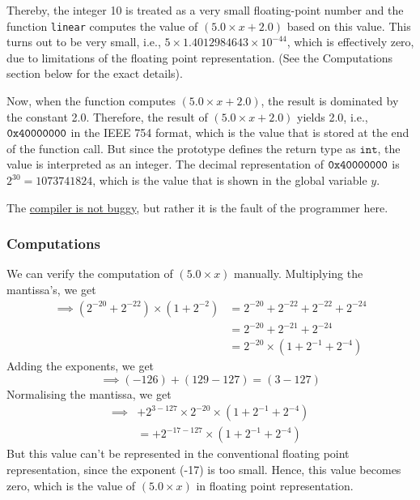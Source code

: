 Thereby, the integer 10 is treated as a very small floating-point number and the function \texttt{linear} computes the value of \( (5.0 \times x + 2.0) \) based on this value.
This turns out to be very small, i.e., \( 5 \times 1.4012984643 \times 10^{-44} \), which is effectively zero, due to limitations of the floating point representation.
(See the Computations section below for the exact details).

Now, when the function computes \( (5.0 \times x + 2.0) \), the result is dominated by the constant 2.0.
Therefore, the result of \( (5.0 \times x + 2.0) \) yields 2.0, i.e., \( \texttt{0x40000000} \) in the IEEE 754 format, which is the value that is stored at the end of the function call.
But since the prototype defines the return type as \( \texttt{int} \), the value is interpreted as an integer.
The decimal representation of \( \texttt{0x40000000} \) is \( 2^{30} = \boxed{1073741824} \), which is the value that is shown in the global variable \( y \).

The \underline{compiler is not buggy}, but rather it is the fault of the programmer here.

\subsubsection*{Computations}

We can verify the computation of \( (5.0 \times x) \) manually.
Multiplying the mantissa's, we get
\begin{align*}
    \implies
    (2^{-20} + 2^{-22}) \times (1 + 2^{-2})
     & =
    2^{-20} + 2^{-22} + 2^{-22} + 2^{-24}
    \\ & =
    2^{-20} + 2^{-21}+ 2^{-24}
    \\ & =
    2^{-20} \times (1 + 2^{-1}+ 2^{-4})
\end{align*}
Adding the exponents, we get
\[
    \implies
    (-126) + (129 - 127)
    =
    (3 - 127)
\]
Normalising the mantissa, we get
\begin{align*}
    \implies
     &
    + 2^{3 - 127} \times 2^{-20} \times (1 + 2^{-1}+ 2^{-4})
    \\ & =
    + 2^{-17 - 127} \times (1 + 2^{-1}+ 2^{-4})
\end{align*}
But this value can't be represented in the conventional floating point representation, since the exponent (-17) is too small.
Hence, this value becomes zero, which is the value of \( (5.0 \times x) \) in floating point representation.
